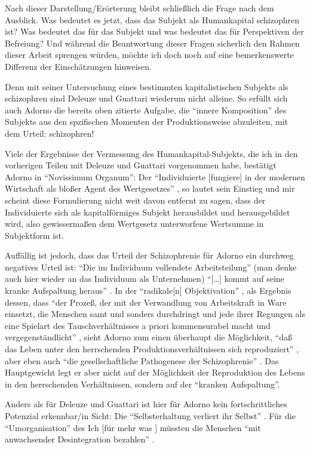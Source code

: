 \documentclass[12pt,
               DIV13,
               paper=a4,
               twoside=false,
               onehalfspacing,
               bibliography=totoc,
               toc=graduated,
               draft,
               ]{scrartcl}
\newcommand{\lips}{\dots\unkern}
\newcommand{\pc}[2]{\parencite[#1]{#2}}
\newcommand{\worries}[1]{\ifdraft{\textcolor{blue}{\texttt{(#1)}}}{}}
\begin{document}
Nach dieser Darstellung/Erörterung bleibt schließlich die Frage
nach dem Ausblick. Was bedeutet es jetzt, dass das Subjekt als
Humankapital schizophren ist? Was bedeutet das für das Subjekt und was
bedeutet das für Perspektiven der Befreiung? Und während die
Beantwortung dieser Fragen sicherlich den Rahmen dieser Arbeit
sprengen würden, möchte ich doch noch auf eine bemerkenswerte
Differenz der Einschätzungen hinweisen.

Denn mit seiner Untersuchung eines bestimmten kapitalistischen
Subjekts als schizophren sind Deleuze und Guattari wiederum nicht
alleine. So erfüllt sich auch Adorno die bereits oben zitierte
Aufgabe, die "`innere Komposition"' \pc{261}{min} des Subjekts aus den
spzifischen Momenten der Produktionsweise abzuleiten, mit dem Urteil:
schizophren!

Viele der Ergebnisse der Vermessung des Humankapital-Subjekts, die ich
in den vorherigen Teilen mit Deleuze und Guattari vorgenommen habe,
bestätigt Adorno in "`Novissimum Organum"': Der "`Individuierte
[fungiere] in der modernen Wirtschaft als bloßer Agent des
Wertgesetzes"' \pc{261}{min}, so lautet sein Einstieg und mir scheint
diese Formulierung nicht weit davon entfernt zu sagen, dass der
Individuierte sich als kapitalförmiges Subjekt herausbildet und
herausgebildet wird, also gewissermaßen dem Wertgesetz unterworfene
Wertsumme in Subjektform ist.

Auffällig ist jedoch, dass das Urteil der Schizophrenie für Adorno ein
durchweg negatives Urteil ist: "`Die im Individuum vollendete
Arbeitsteilung"' (man denke auch hier wieder an das Individuum als
Unternehmen) "`[\lips] kommt auf seine kranke Aufspaltung heraus"'
\pc{263}{min}. In der "`radikale[n] Objektivation"' \pc{263}{min}, als
Ergebnis dessen, dass "`der Prozeß, der mit der Verwandlung von
Arbeitskraft in Ware einsetzt, die Menschen samt und sonders
durchdringt und jede ihrer Regungen als eine Spielart des
Tauschverhältnisses a priori kommensurabel macht und
vergegenständlicht"' \pc{262}{min}, sieht Adorno zum einen überhaupt
die Möglichkeit, "`daß das Leben unter den herrschenden
Produktionsverhältnissen sich reproduziert"' \pc{262}{min}, aber eben
auch "`die gesellschaftliche Pathogenese der Schizophrenie"'
\pc{263}{min}. Das Hauptgewicht legt er aber nicht auf der Möglichkeit
der Reproduktion des Lebens in den herrschenden Verhältnissen, sondern
auf der "`kranken Aufspaltung"'.

Anders als für Deleuze und Guattari ist hier für Adorno kein
fortschrittliches Potenzial erkennbar/in Sicht: Die "`Selbsterhaltung
verliert ihr Selbst"' \pc{263}{min}. Für die "`Umorganisation"'
\pc{263}{min} des Ich [für mehr was \worries{?}] müssten die Menschen
"`mit anwachsender Desintegration bezahlen"' \pc{263}{min}.
\end{document}
